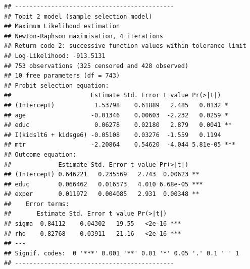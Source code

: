 \documentclass[]{book}
\begin{document}
\begin{verbatim}
## --------------------------------------------
## Tobit 2 model (sample selection model)
## Maximum Likelihood estimation
## Newton-Raphson maximisation, 4 iterations
## Return code 2: successive function values within tolerance limit
## Log-Likelihood: -913.5131 
## 753 observations (325 censored and 428 observed)
## 10 free parameters (df = 743)
## Probit selection equation:
##                      Estimate Std. Error t value Pr(>|t|)    
## (Intercept)           1.53798    0.61889   2.485   0.0132 *  
## age                  -0.01346    0.00603  -2.232   0.0259 *  
## educ                  0.06278    0.02180   2.879   0.0041 ** 
## I(kidslt6 + kidsge6) -0.05108    0.03276  -1.559   0.1194    
## mtr                  -2.20864    0.54620  -4.044 5.81e-05 ***
## Outcome equation:
##             Estimate Std. Error t value Pr(>|t|)    
## (Intercept) 0.646221   0.235569   2.743  0.00623 ** 
## educ        0.066462   0.016573   4.010 6.68e-05 ***
## exper       0.011972   0.004085   2.931  0.00348 ** 
##    Error terms:
##       Estimate Std. Error t value Pr(>|t|)    
## sigma  0.84112    0.04302   19.55   <2e-16 ***
## rho   -0.82768    0.03911  -21.16   <2e-16 ***
## ---
## Signif. codes:  0 '***' 0.001 '**' 0.01 '*' 0.05 '.' 0.1 ' ' 1
## --------------------------------------------
\end{verbatim}


\end{document}
